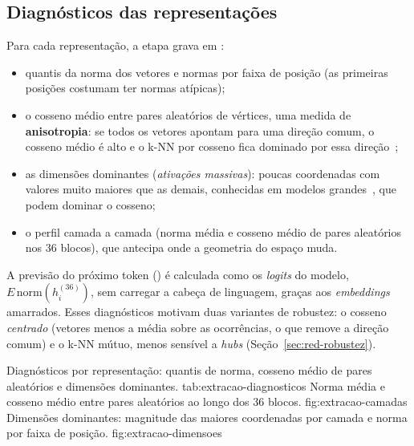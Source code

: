 \subsection{Diagnósticos das representações}\label{sec:mod-diagnosticos}

Para cada representação, a etapa  grava em :
\begin{itemize}
    \item quantis da norma dos vetores e normas por faixa de posição (as primeiras posições
    costumam ter normas atípicas);
    \item o cosseno médio entre pares aleatórios de vértices, uma medida de
    \textbf{anisotropia}: se todos os vetores apontam para uma direção comum, o cosseno médio
    é alto e o k-NN por cosseno fica dominado por essa direção~\cite{ethayarajh2019};
    \item as dimensões dominantes (\emph{ativações massivas}): poucas coordenadas com valores
    muito maiores que as demais, conhecidas em modelos grandes~\cite{sun2024,timkey2021}, que
    podem dominar o cosseno;
    \item o perfil camada a camada (norma média e cosseno médio de pares aleatórios nos 36
    blocos), que antecipa onde a geometria do espaço muda.
\end{itemize}
A previsão do próximo token () é calculada como os \emph{logits} do modelo,
$E\,\mathrm{norm}(h^{(36)}_i)$, sem carregar a cabeça de linguagem, graças aos
\emph{embeddings} amarrados.
Esses diagnósticos motivam duas variantes de robustez: o cosseno \emph{centrado} (vetores menos
a média sobre as ocorrências, o que remove a direção comum) e o k-NN mútuo, menos sensível a
\emph{hubs} (Seção~\ref{sec:red-robustez}).

    {Diagnósticos por representação: quantis de norma, cosseno médio de pares aleatórios e
    dimensões dominantes.}
    {tab:extracao-diagnosticos}
    {Norma média e cosseno médio entre pares aleatórios ao longo dos 36 blocos.}
    {fig:extracao-camadas}
    {Dimensões dominantes: magnitude das maiores coordenadas por camada e norma por faixa de
    posição.}
    {fig:extracao-dimensoes}
